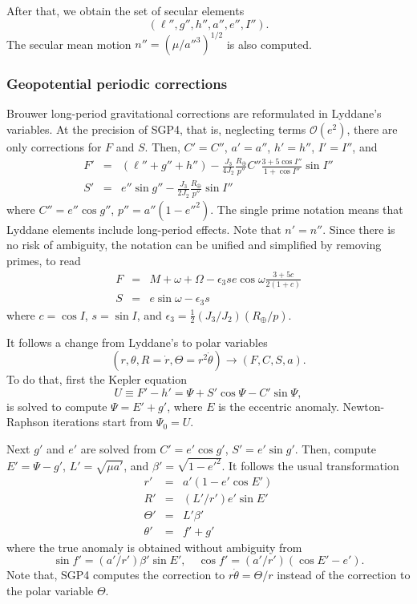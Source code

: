 \documentclass{article}
\begin{document}
After that, we obtain the set of secular elements
\[
(\ell'',g'',h'',a'',e'',I'').
\]
The secular mean motion $n''=(\mu/a''^3)^{1/2}$ is also computed.

\subsubsection{Geopotential periodic corrections} \label{s:SGP4lp}

Brouwer long-period gravitational corrections are reformulated in Lyddane's variables. At the precision of SGP4, that is, neglecting terms $\mathcal{O}(e^2)$, there are only corrections for $F$ and $S$. Then, $C'= C''$, $a'=a''$, $h'=h''$, $I'=I''$, and
\begin{eqnarray*}
F' &=& (\ell''+g''+h'')-\frac{J_3}{4J_2}\frac{R_\oplus}{p''}C''\frac{3+5\cos{I}''}{1+\cos{I}''}\sin{I}'' \\
S' &=&  e''\sin{g}'' -\frac{J_3}{2J_2}\frac{R_\oplus}{p''}\sin{I}''
\end{eqnarray*}
where $C''=e''\cos{g}''$, $p''=a''(1-e''^2)$. The single prime notation means that Lyddane elements include long-period effects. Note that $n'=n''$. Since there is no risk of ambiguity, the notation can be unified and simplified by removing primes, to read
\begin{eqnarray*}
F &=&  M + \omega + \Omega - \epsilon_3 s e \cos{\omega}\frac{3+5c}{2(1+c)} \\
S &=& e\sin{\omega} - \epsilon_3 s
\end{eqnarray*}
where $c=\cos{I}$, $s=\sin{I}$, and $\epsilon_3=\frac{1}{2}(J_3/J_2)(R_\oplus/p)$.

It follows a change from Lyddane's to polar variables
\[
(r,\theta,R=\dot{r},\Theta=r^2\dot\theta)\longrightarrow(F,C,S,a).
\]
To do that, first the Kepler equation
\[
U\equiv{F'-h'}=\Psi+S'\cos\Psi-C'\sin\Psi,
\]
is solved to compute $\Psi=E'+g'$, where $E$ is the eccentric anomaly. Newton-Raphson iterations start from $\Psi_0=U$.

Next $g'$ and $e'$ are solved from $C'=e'\cos{g'}$, $S'=e'\sin{g}'$. Then, compute $E'=\Psi-g'$, $L'=\sqrt{\mu{a}'}$, and $\beta'=\sqrt{1-e'^2}$. It follows the usual transformation
\begin{eqnarray} \label{eq:utor}
r' &=& a'(1-e'\cos{E}') \\
R' &=& (L'/r')e'\sin{E}' \\
\Theta' &=& L'\beta' \\
\theta' &=& f'+g'
\end{eqnarray}
where the true anomaly is obtained without ambiguity from
\begin{equation} \label{eq:utof}
\sin{f}'=(a'/r')\beta'\sin{E}',\quad \cos{f}'=(a'/r')(\cos{E}'-e').
\end{equation}
Note that, SGP4 computes the correction to $r\dot\theta=\Theta/r$ instead of the correction to the polar variable $\Theta$.
\end{document}
